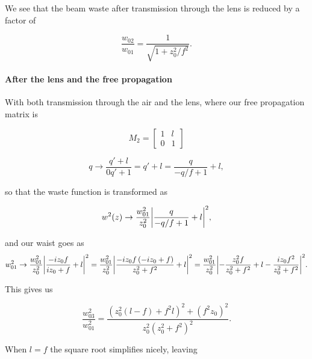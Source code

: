 {We see that the beam waste after transmission through the lens is reduced by a factor of

\begin{dmath}\label{eqn:problemSet4Problem1:140}
\frac
{w_{02}}
{w_{01}}
=
\frac{1}{ \sqrt{1 + z_0^2/f^2} }.
\end{dmath}

\paragraph{After the lens and the free propagation}

With both transmission through the air and the lens, where our free propagation matrix is

\begin{dmath}\label{eqn:problemSet4Problem1:160}
M_2 = 
\begin{bmatrix}
1 & l \\
0 & 1
\end{bmatrix}
\end{dmath}

\begin{dmath}\label{eqn:problemSet4Problem1:180}
q 
\rightarrow \frac{q' + l}{0 q' + 1} 
= q' + l 
= \frac{q}{-q/f + 1} + l,
\end{dmath}

so that the waste function is transformed as

\begin{dmath}\label{eqn:problemSet4Problem1:200}
w^2(z) \rightarrow \frac{w_{01}^2}{z_0^2} \Abs{ 
\frac{q}{-q/f + 1} + l
}^2,
\end{dmath}

and our waist goes as
\begin{dmath}\label{eqn:problemSet4Problem1:220}
w_{01}^2 
\rightarrow \frac{w_{01}^2}{z_0^2} \Abs{ 
\frac{-i z_0 f }{i z_0 + f} + l
}^2
= \frac{w_{01}^2}{z_0^2} \Abs{ 
\frac{-i z_0 f \left(-i z_0 + f\right)}{z_0^2 + f^2} + l
}^2
= \frac{w_{01}^2}{z_0^2} \Abs{ 
-\frac{z_0^2 f}{z_0^2 + f^2} + l
-\frac{i z_0 f^2 }{z_0^2 + f^2} 
}^2.
\end{dmath}

This gives us

\begin{dmath}\label{eqn:problemSet4Problem1:240}
\boxed{
\frac{w_{03}^2}{w_{01}^2} 
= \frac{
\left(z_0^2 \left(l - f\right) + f^2 l\right)^2
+ \left( f^2 z_0  \right)^2
}{z_0^2 \left(z_0^2 + f^2\right)^2 }.
}
\end{dmath}

When $l = f$ the square root simplifies nicely, leaving

}
